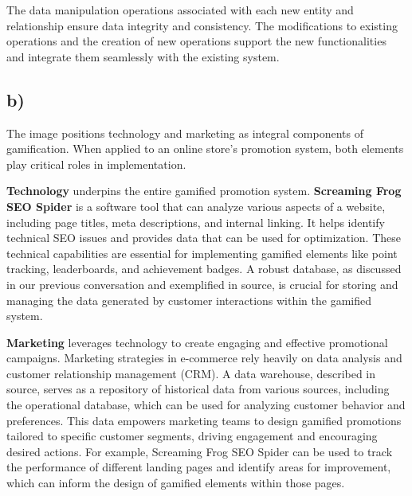 \documentclass[
]{report}
\begin{document}
\begin{tcolorbox}[enhanced jigsaw, coltitle=black, leftrule=.75mm, colframe=quarto-callout-note-color-frame, title=\textcolor{quarto-callout-note-color}{\faInfo}\hspace{0.5em}{Note}, titlerule=0mm, arc=.35mm, colbacktitle=quarto-callout-note-color!10!white, colback=white, left=2mm, toprule=.15mm, bottomrule=.15mm, toptitle=1mm, breakable, bottomtitle=1mm, rightrule=.15mm, opacityback=0, opacitybacktitle=0.6]

The data manipulation operations associated with each new entity and
relationship ensure data integrity and consistency. The modifications to
existing operations and the creation of new operations support the new
functionalities and integrate them seamlessly with the existing system.

\end{tcolorbox}

\subsection{b)}\label{b}

The image positions technology and marketing as integral components of
gamification. When applied to an online store's promotion system, both
elements play critical roles in implementation.

\textbf{Technology} underpins the entire gamified promotion system.
\textbf{Screaming Frog SEO Spider} is a software tool that can analyze
various aspects of a website, including page titles, meta descriptions,
and internal linking. It helps identify technical SEO issues and
provides data that can be used for optimization. These technical
capabilities are essential for implementing gamified elements like point
tracking, leaderboards, and achievement badges. A robust database, as
discussed in our previous conversation and exemplified in source, is
crucial for storing and managing the data generated by customer
interactions within the gamified system.

\textbf{Marketing} leverages technology to create engaging and effective
promotional campaigns. Marketing strategies in e-commerce rely heavily
on data analysis and customer relationship management (CRM). A data
warehouse, described in source, serves as a repository of historical
data from various sources, including the operational database, which can
be used for analyzing customer behavior and preferences. This data
empowers marketing teams to design gamified promotions tailored to
specific customer segments, driving engagement and encouraging desired
actions. For example, Screaming Frog SEO Spider can be used to track the
performance of different landing pages and identify areas for
improvement, which can inform the design of gamified elements within
those pages.
\end{document}

